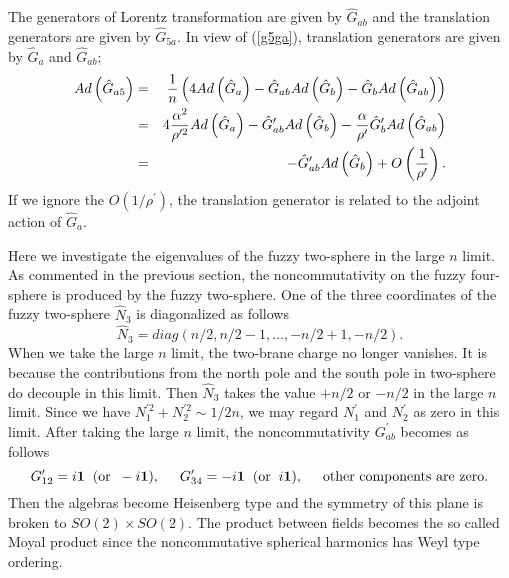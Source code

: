 \documentclass[a4paper,11pt]{article}
\begin{document}
The generators of Lorentz transformation are given by 
$\hat{G}_{ab}$ and the translation generators are given by 
$\hat{G}_{5a}$. 
In view of (\ref{g5ga}), translation generators are given by 
$\hat{G}_{a}$ and $\hat{G}_{ab}$; 
\begin{eqnarray}
Ad\left(\hat{G}_{a5}\right)&=&
\frac{1}{n}\left(4Ad\left(\hat{G}_{a}\right)
-\hat{G}_{ab} Ad\left(\hat{G}_{b}\right)
-\hat{G}_{b}Ad\left(\hat{G}_{ab}\right) \right) \cr 
&=&4\frac{\alpha^{2}}{\rho^{\prime 2}}Ad\left(\hat{G}_{a}\right)
-\hat{G}_{ab}^{\prime} Ad\left(\hat{G}_{b}\right)
-\frac{\alpha}{\rho^{\prime}}\hat{G}_{b}^{\prime}
Ad\left(\hat{G}_{ab}\right) \cr 
&=&-\hat{G}_{ab}^{\prime} Ad\left(\hat{G}_{b}\right)
+O\left( \frac{1}{\rho^{\prime}}\right).
\end{eqnarray}
If we ignore the $O(1/\rho^{\prime})$, the translation 
generator is related to the adjoint action of $\hat{G}_{a}$. 

Here we investigate the eigenvalues of the fuzzy two-sphere 
in the large $n$ limit.
As commented in the previous section, the noncommutativity 
on the fuzzy four-sphere is produced by the fuzzy two-sphere.  
One of the three coordinates of 
the fuzzy two-sphere $\hat{N}_{3}$ is diagonalized 
as follows 
\begin{equation}
\hat{N}_{3}=diag(n/2,n/2-1, \ldots ,-n/2+1,-n/2). 
\end{equation}
When we take the large $n$ limit, the two-brane charge 
no longer vanishes. 
It is because the contributions 
from the north pole and the south pole 
in two-sphere do decouple in this limit. 
Then $\hat{N}_{3}$ takes the value $+n/2$ or $-n/2$ 
in the large $n$ limit. 
Since we have $N_{1}^{\prime 2}+N_{2}^{\prime 2}\sim 1/2n$, 
we may regard $N_{1}^{\prime }$ and $N_{2}^{\prime }$ 
as zero in this limit. 
After taking the large $n$ limit, the noncommutativity 
$G_{ab}^{\prime}$ becomes as follows 
\begin{equation}
G_{12}^{\prime}=i{\bf 1}\hspace{0.2cm}(\mbox{or}\hspace{0.2cm}
 -i{\bf 1}), 
\hspace{0.5cm} 
G_{34}^{\prime}=-i{\bf 1}\hspace{0.2cm}(\mbox{or}\hspace{0.2cm}
 i{\bf 1}),
\hspace{0.5cm}
\mbox{other components are zero}. 
\label{noncommutativityflat}
\end{equation}
Then the algebras become Heisenberg type and 
the symmetry of this plane is broken to $SO(2)\times SO(2)$. 
The product between fields becomes the so called Moyal product 
since the noncommutative spherical harmonics has Weyl type ordering. 
\end{document}

